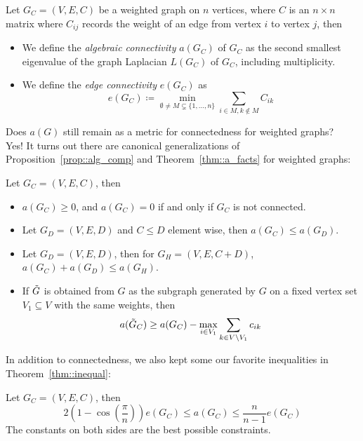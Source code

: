 \documentclass{article}
\begin{document}
\begin{definition}
    Let $G_C = (V, E, C)$ be a weighted graph on $n$ vertices, where $C$ is an $n \times n$ matrix where $C_{ij}$ records the weight of an edge from vertex $i$ to vertex $j$, then  
    \begin{itemize}
        \item We define the \textit{algebraic connectivity} $a(G_C)$ of $G_C$ as the second smallest eigenvalue of the graph Laplacian $L(G_C)$ of $G_C$, including multiplicity.
        \item We define the \textit{edge connectivity} $e(G_C)$ as
        \[e(G_C) \coloneqq \min_{\emptyset \neq M \subsetneq \{1, ...,n\}} \sum_{i \in M, k \notin M} C_{ik}\]
    \end{itemize}
\end{definition}

Does $a(G)$ still remain as a metric for connectedness for weighted graphs?\\

Yes! It turns out there are canonical generalizations of Proposition~\ref{prop::alg_comp} and Theorem~\ref{thm::a_facts} for weighted graphs:

\begin{theorem}
    Let $G_C = (V, E, C)$, then
    \begin{itemize}
        \item $a(G_C) \geq 0$, and $a(G_C) = 0$ if and only if $G_C$ is not connected.
        \item Let $G_D = (V, E, D)$ and $C \leq D$ element wise, then $a(G_C) \leq a(G_D)$.
        \item Let $G_D = (V, E, D)$, then for $G_H = (V, E, C + D)$, $a(G_C) + a(G_D) \leq a(G_H)$.
        \item If $\Tilde{G}$ is obtained from $G$ as the subgraph generated by $G$ on a fixed vertex set $V_1 \subseteq V$ with the same weights, then
        \[a(\Tilde{G}_C) \geq a(G_C) - \max_{i \in V_1} \sum_{k \in V \setminus V_1} c_{ik}\]
    \end{itemize}
\end{theorem}

In addition to connectedness, we also kept some our favorite inequalities in Theorem~\ref{thm::inequal}:

\begin{theorem}
    Let $G_C = (V, E, C)$, then
    \[2(1 - \cos(\frac{\pi}{n})) e(G_C) \leq a(G_C) \leq \frac{n}{n-1}e(G_C)\]
    The constants on both sides are the best possible constraints.
\end{theorem}
\end{document}
